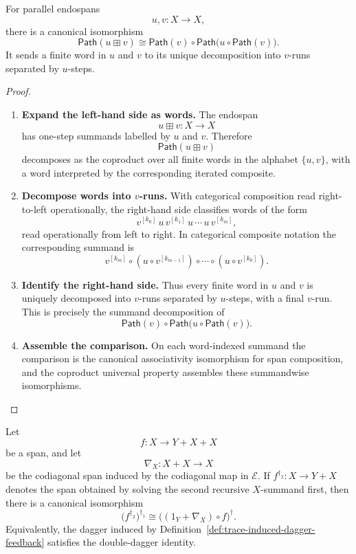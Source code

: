 \begin{lemma}
\label{lem:binary-path-decomposition-feedback}
For parallel endospans
\[
  u,v:X\to X,
\]
there is a canonical isomorphism
\[
  \mathsf{Path}(u\boxplus v)
  \cong
  \mathsf{Path}(v)\circ
  \mathsf{Path}\bigl(u\circ\mathsf{Path}(v)\bigr).
\]
It sends a finite word in \(u\) and \(v\) to its unique decomposition into
\(v\)-runs separated by \(u\)-steps.
\end{lemma}

\begin{proof}
\begin{enumerate}
  \item \textbf{Expand the left-hand side as words.}
  The endospan
  \[
    u\boxplus v:X\to X
  \]
  has one-step summands labelled by \(u\) and \(v\). Therefore
  \[
    \mathsf{Path}(u\boxplus v)
  \]
  decomposes as the coproduct over all finite words in the alphabet
  \(\{u,v\}\), with a word interpreted by the corresponding iterated
  composite.

  \item \textbf{Decompose words into \(v\)-runs.}
  With categorical composition read right-to-left operationally, the
  right-hand side classifies words of the form
  \[
    v^{[k_0]}\,u\,v^{[k_1]}\,u\,\cdots\,u\,v^{[k_m]},
  \]
  read operationally from left to right. In categorical composite notation the
  corresponding summand is
  \[
    v^{[k_m]}
    \circ
    (u\circ v^{[k_{m-1}]})
    \circ
    \cdots
    \circ
    (u\circ v^{[k_0]}).
  \]

  \item \textbf{Identify the right-hand side.}
  Thus every finite word in \(u\) and \(v\) is uniquely decomposed into
  \(v\)-runs separated by \(u\)-steps, with a final \(v\)-run. This is
  precisely the summand decomposition of
  \[
    \mathsf{Path}(v)\circ
    \mathsf{Path}\bigl(u\circ\mathsf{Path}(v)\bigr).
  \]

  \item \textbf{Assemble the comparison.}
  On each word-indexed summand the comparison is the canonical associativity
  isomorphism for span composition, and the coproduct universal property
  assembles these summandwise isomorphisms.
\end{enumerate}
\end{proof}

\begin{theorem}
\label{thm:conway-double-dagger-feedback}
Let
\[
  f:X\to Y+X+X
\]
be a span, and let
\[
  \nabla_X:X+X\to X
\]
be the codiagonal span induced by the codiagonal map in \(\mathcal E\). If
\(f^{\dagger_2}:X\to Y+X\) denotes the span obtained by solving the second
recursive \(X\)-summand first, then there is a canonical isomorphism
\[
  \bigl(f^{\dagger_2}\bigr)^{\dagger_1}
  \cong
  \bigl((1_Y+\nabla_X)\circ f\bigr)^\dagger .
\]
Equivalently, the dagger induced by
Definition~\ref{def:trace-induced-dagger-feedback} satisfies the
double-dagger identity.
\end{theorem}

